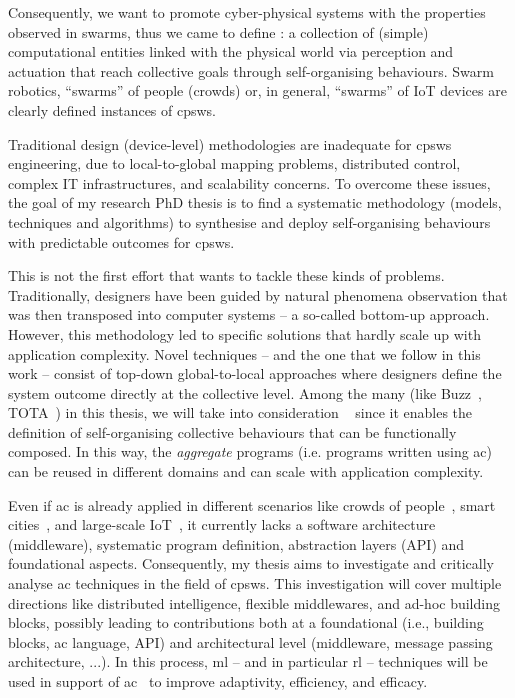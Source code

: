 \documentclass[11pt]{article}
\begin{document}
Consequently, we want to promote cyber-physical systems with the properties observed in swarms, thus we came to define : a collection of (simple) computational entities linked with the physical world via perception and actuation that reach collective goals through self-organising behaviours.
%
Swarm robotics, ``swarms” of people (crowds) or, in general, ``swarms” of IoT devices are clearly defined instances of \acp{cpsw}.

Traditional design (device-level) methodologies are inadequate for \acp{cpsw} engineering, due to local-to-global mapping problems, distributed control, complex IT infrastructures, and scalability concerns.
%
To overcome these issues, the goal of my research PhD thesis is to find a systematic methodology (models, techniques and algorithms) to synthesise and deploy self-organising behaviours with predictable outcomes for \acp{cpsw}.

This is not the first effort that wants to tackle these kinds of problems. 
%
Traditionally, designers have been guided by natural phenomena observation that was then transposed into computer systems -- a so-called bottom-up approach. 
%
However, this methodology led to specific solutions that hardly scale up with application complexity.
%
Novel techniques -- and the one that we follow in this work -- consist of top-down global-to-local approaches where designers define the system outcome directly at the collective level.
%
Among the many (like Buzz~\cite{DBLP:journals/software/PinciroliB16}, TOTA~\cite{DBLP:conf/icdcsw/MameiZL03}) in this thesis, we will take into consideration ~\cite{DBLP:journals/computer/BealPV15} since it enables the definition of self-organising collective behaviours that can be functionally composed. 
%
In this way, the \textit{aggregate} programs (i.e. programs written using \ac{ac}) can be reused in different domains and can scale with application complexity. 

Even if \ac{ac} is already applied in different scenarios like crowds of people~\cite{DBLP:journals/computer/BealPV15}, smart cities~\cite{DBLP:journals/isci/CasadeiFPRSV19}, and large-scale IoT~\cite{DBLP:journals/fgcs/CasadeiFPRSV19}, it currently lacks a software architecture (middleware), systematic program definition, abstraction layers (API) and foundational aspects.
%
Consequently, my thesis aims to investigate and critically analyse \ac{ac} techniques in the field of \acp{cpsw}.
%
This investigation will cover multiple directions like distributed intelligence, flexible middlewares, and ad-hoc building blocks, possibly leading to contributions both at a foundational (i.e., building blocks, \ac{ac} language, API) and architectural level (middleware, message passing architecture, ...).
%
In this process, \ac{ml} -- and in particular \ac{rl} -- techniques will be used in support of \ac{ac}~\cite{research} to improve adaptivity, efficiency, and efficacy.
\end{document}
